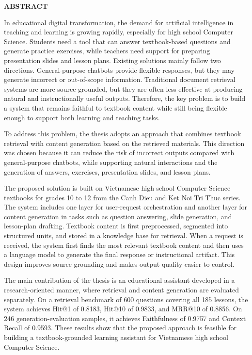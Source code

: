 \documentclass[../DoAn.tex]{subfiles}
\begin{document}
\begin{center}
    \Large{\textbf{ABSTRACT}}\\
\end{center}
\vspace{1cm}
In educational digital transformation, the demand for artificial intelligence in teaching and learning is growing rapidly, especially for high school Computer Science. Students need a tool that can answer textbook-based questions and generate practice exercises, while teachers need support for preparing presentation slides and lesson plans. Existing solutions mainly follow two directions. General-purpose chatbots provide flexible responses, but they may generate incorrect or out-of-scope information. Traditional document retrieval systems are more source-grounded, but they are often less effective at producing natural and instructionally useful outputs. Therefore, the key problem is to build a system that remains faithful to textbook content while still being flexible enough to support both learning and teaching tasks.

To address this problem, the thesis adopts an approach that combines textbook retrieval with content generation based on the retrieved materials. This direction was chosen because it can reduce the risk of incorrect outputs compared with general-purpose chatbots, while supporting natural interactions and the generation of answers, exercises, presentation slides, and lesson plans.

The proposed solution is built on Vietnamese high school Computer Science textbooks for grades 10 to 12 from the Canh Dieu and Ket Noi Tri Thuc series. The system includes one layer for user-request orchestration and another layer for content generation in tasks such as question answering, slide generation, and lesson-plan drafting. Textbook content is first preprocessed, segmented into structured units, and stored in a knowledge base for retrieval. When a request is received, the system first finds the most relevant textbook content and then uses a language model to generate the final response or instructional artifact. This design improves source grounding and makes output quality easier to control.

The main contribution of the thesis is an educational assistant developed in a research-oriented manner, where retrieval and content generation are evaluated separately. On a retrieval benchmark of 600 questions covering all 185 lessons, the system achieves Hit@1 of 0.8183, Hit@10 of 0.9833, and MRR@10 of 0.8856. On 246 generation-evaluation samples, it achieves Faithfulness of 0.9757 and Context Recall of 0.9593. These results show that the proposed approach is feasible for building a textbook-grounded learning assistant for Vietnamese high school Computer Science.
\end{document}
